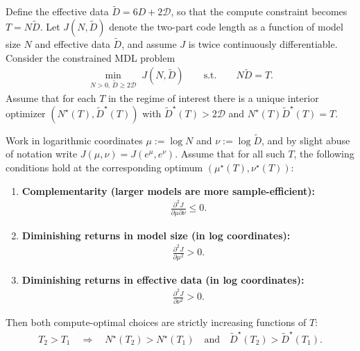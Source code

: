 \documentclass[twoside]{article}
\newcommand{\D}{\mathcal{D}}
\begin{document}
\begin{theorem}
\label{thm:ND-monotone-logconvex}
Define the effective data $\widetilde{D} = 6D + 2\D$, so that the compute constraint becomes $T = N\widetilde{D}$. Let $J(N, \widetilde{D})$ denote the two-part code length as a function of model size $N$ and effective data $\widetilde{D}$, and assume $J$ is twice continuously differentiable. Consider the constrained MDL problem
\begin{align}
    \min_{N > 0,\, \widetilde{D} \ge 2\D}\; J(N, \widetilde{D})
    \qquad \text{s.t.} \qquad
    N\widetilde{D} = T.
\end{align}
Assume that for each $T$ in the regime of interest there is a unique interior optimizer $(N^\star(T), \widetilde{D}^\star(T))$ with $\widetilde{D}^\star(T) > 2\D$ and $N^\star(T)\widetilde{D}^\star(T) = T$.

Work in logarithmic coordinates $\mu := \log N$ and $\nu := \log \widetilde{D}$, and by slight abuse of notation write $J(\mu, \nu) = J(e^\mu, e^\nu)$. Assume that for all such $T$, the following conditions hold at the corresponding optimum $(\mu^\star(T), \nu^\star(T))$:
\begin{enumerate}
    \item \textbf{Complementarity (larger models are more sample-efficient):}
    \begin{align}
        \frac{\partial^2 J}{\partial \mu \partial \nu} \le 0.
    \end{align}

    \item \textbf{Diminishing returns in model size (in log coordinates):}
    \begin{align}
        \frac{\partial^2 J}{\partial \mu^2} > 0.
    \end{align}

    \item \textbf{Diminishing returns in effective data (in log coordinates):}
    \begin{align}
        \frac{\partial^2 J}{\partial \nu^2} > 0.
    \end{align}
\end{enumerate}

Then both compute-optimal choices are strictly increasing functions of $T$:
\begin{align}
    T_2 > T_1
    \quad \Longrightarrow \quad
    N^\star(T_2) > N^\star(T_1)
    \quad \text{and} \quad
    \widetilde{D}^\star(T_2) > \widetilde{D}^\star(T_1).
\end{align}
\end{theorem}
\end{document}
